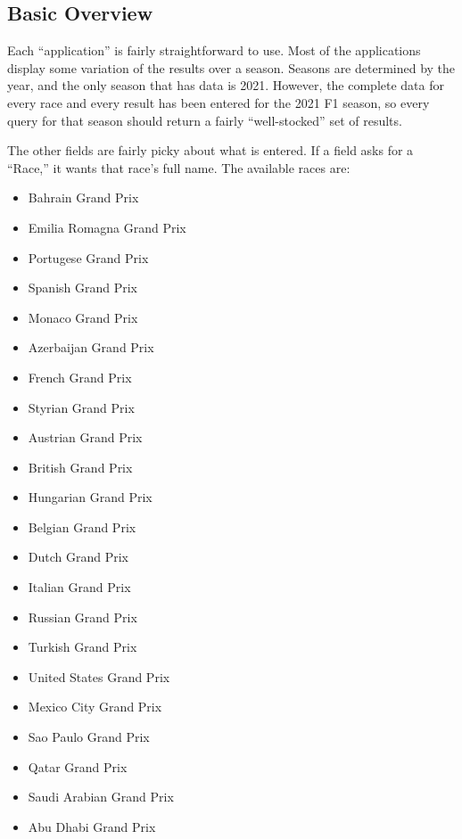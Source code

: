 \documentclass{article} %
\begin{document}
\subsection{Basic Overview}

Each ``application'' is fairly straightforward to use. Most of the
applications display some variation of the results over a season.
Seasons are determined by the year, and the only season that has data is
2021. However, the complete data for every race and every result has
been entered for the 2021 F1 season, so every query for that season
should return a fairly ``well-stocked'' set of results.

The other fields are fairly picky about what is entered. If a field asks
for a ``Race,'' it wants that race's full name. The available races are:
\begin{multicols}{2}
\begin{itemize}
    \itemsep-0.1em
    \item Bahrain Grand Prix
    \item Emilia Romagna Grand Prix
    \item Portugese Grand Prix
    \item Spanish Grand Prix
    \item Monaco Grand Prix
    \item Azerbaijan Grand Prix
    \item French Grand Prix
    \item Styrian Grand Prix
    \item Austrian Grand Prix
    \item British Grand Prix
    \item Hungarian Grand Prix
    \item Belgian Grand Prix
    \item Dutch Grand Prix
    \item Italian Grand Prix
    \item Russian Grand Prix
    \item Turkish Grand Prix
    \item United States Grand Prix
    \item Mexico City Grand Prix
    \item Sao Paulo Grand Prix
    \item Qatar Grand Prix
    \item Saudi Arabian Grand Prix
    \item Abu Dhabi Grand Prix
\end{itemize}
\end{multicols}
\end{document}
